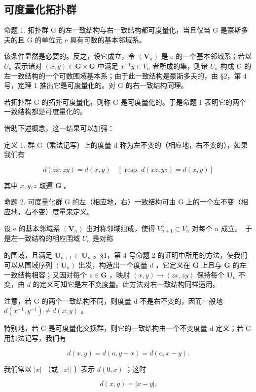 \subsection{可度量化拓扑群}

命题 1. 拓扑群 G 的左一致结构与右一致结构都可度量化，当且仅当 G 是豪斯多夫的且 G 的单位元 e 具有可数的基本邻域系。

该条件显然是必要的。反之，设它成立，令 \((\mathbf{V}_{n})\) 是 e 的一个基本邻域系；若以 \(U_{n}\) 表示诸对 \((x, y) \in \mathbf{G} \times \mathbf{G}\) 中满足 \(x^{-1}y \in V_{n}\) 者所成的集，则诸 \(U_{n}\) 构成 G 的左一致结构的一个可数围域基本系；由于此一致结构是豪斯多夫的，由 §2，第 4 号，定理 1 推出它是可度量化的。对 G 的右一致结构同理。

若拓扑群 G 的拓扑可度量化，则称 G 是可度量化的。于是命题 1 表明它的两个一致结构都是可度量化的。

借助下述概念，这一结果可以加强：

定义 1. 群 G（乘法记写）上的度量 d 称为左不变的（相应地，右不变的），如果我们有

\[
d (z x, z y) = d (x, y) \quad [ \text { resp. } d (x z, y z) = d (x, y) ]
\]

其中 \(x, y, z\) 取遍 \(\mathbf{G}\) 。

命题 2. 可度量化群 G 的左（相应地，右）一致结构可由 G 上的一个左不变（相应地，右不变）度量来定义。

设 e 的基本邻域系 \((\mathbf{V}_{n})\) 由对称邻域组成，使得 \(V_{n+1}^{3} \subset V_{n}\) 对每个 n 成立。~于是左一致结构的相应围域 \(U_{n}\) 是对称

的围域，且满足 \(\mathbf{U}_{n+1} \subset \mathbf{U}_n\) 。§1，第 4 号命题 2 的证明中所用的方法，使我们可以从围域序列 \((\mathbf{U}_n)\) 出发，构造出一个度量 \(d\) ，它定义在 \(\mathbf{G}\) 上且与 \(\mathbf{G}\) 的左一致结构相容；又因对每个 \(z \in \mathbf{G}\) ，映射 \((x, y) \to (zx, zy)\) 保持每个 \(\mathbf{U}_n\) 不变，由 \(d\) 的定义可知它是左不变度量。此方法对右一致结构同样适用。

注意，若 G 的两个一致结构不同，则度量 d 不是右不变的，因而一般地 \(d(x^{-1}, y^{-1}) \neq d(x, y)\) 。

特别地，若 G 是可度量化交换群，则它的一致结构由一个不变度量 d 定义；若 G 用加法记写，我们有

\[
d (x, y) = d (\mathrm{o}, y - x) = d (\mathrm{o}, x - y).
\]

我们常以 \(|x|\) （或 \(||x||\) ）表示 \(d(0, x)\) ；这时

\[
d (x, y) = | x - y |.
\]


